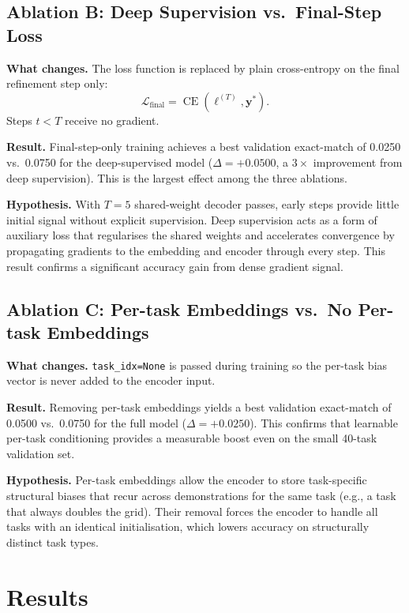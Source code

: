 \documentclass[11pt,a4paper]{article}
\begin{document}
\subsection{Ablation B: Deep Supervision vs.\ Final-Step Loss}

\textbf{What changes.}  The loss function is replaced by plain cross-entropy on the
final refinement step only:
\[
  \mathcal{L}_{\text{final}} = \operatorname{CE}(\ell^{(T)}, \mathbf{y}^*).
\]
Steps $t < T$ receive no gradient.

\textbf{Result.}  Final-step-only training achieves a best validation exact-match of
0.0250 vs.\ 0.0750 for the deep-supervised model ($\Delta = +0.0500$, a $3\times$
improvement from deep supervision).  This is the largest effect among the three
ablations.

\textbf{Hypothesis.}  With $T{=}5$ shared-weight decoder passes, early steps provide
little initial signal without explicit supervision.  Deep supervision acts as a form of
auxiliary loss that regularises the shared weights and accelerates convergence by
propagating gradients to the embedding and encoder through every step.  This result
confirms a significant accuracy gain from dense gradient signal.

\subsection{Ablation C: Per-task Embeddings vs.\ No Per-task Embeddings}

\textbf{What changes.}  \texttt{task\_idx=None} is passed during training so the
per-task bias vector is never added to the encoder input.

\textbf{Result.}  Removing per-task embeddings yields a best validation exact-match of
0.0500 vs.\ 0.0750 for the full model ($\Delta = +0.0250$).  This confirms that
learnable per-task conditioning provides a measurable boost even on the small 40-task
validation set.

\textbf{Hypothesis.}  Per-task embeddings allow the encoder to store task-specific
structural biases that recur across demonstrations for the same task (e.g., a task that
always doubles the grid).  Their removal forces the encoder to handle all tasks with an
identical initialisation, which lowers accuracy on structurally distinct task types.

\section{Results}
\label{sec:results}
\end{document}
